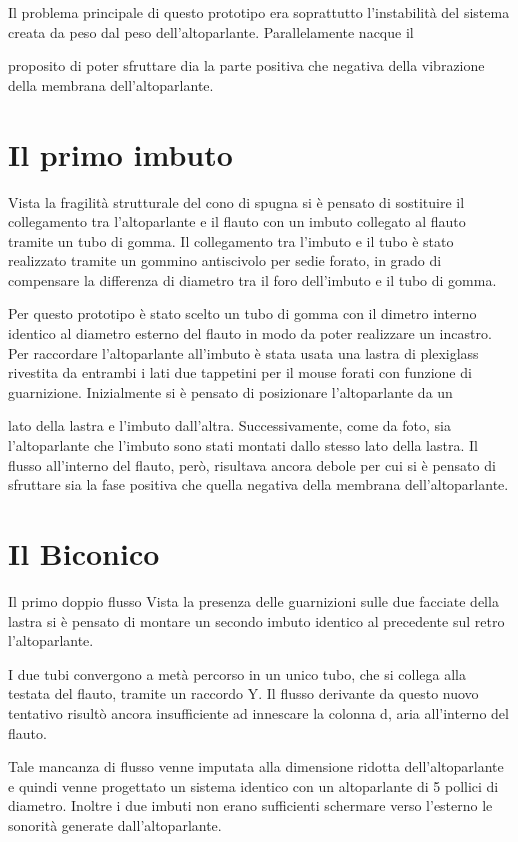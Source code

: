 Il problema principale di questo prototipo era soprattutto l’instabilità del sistema creata da peso dal peso dell’altoparlante. Parallelamente nacque il

proposito di poter sfruttare dia la parte positiva che negativa della vibrazione della membrana dell’altoparlante.

\section{Il primo imbuto}

Vista la fragilità strutturale del cono di spugna si è pensato di sostituire il
collegamento tra l’altoparlante e il flauto con un imbuto collegato al flauto tramite un tubo di gomma.  Il collegamento tra l’imbuto e il tubo è stato
realizzato tramite un gommino antiscivolo per sedie forato, in grado di compensare la differenza di diametro tra il foro dell’imbuto e il tubo di gomma.

Per questo prototipo è stato scelto un tubo di gomma con il dimetro interno identico al diametro esterno del flauto in modo da poter realizzare un incastro.
Per raccordare l’altoparlante all’imbuto è stata usata una lastra di plexiglass rivestita da entrambi i lati due tappetini per il mouse forati con funzione di guarnizione. Inizialmente si è pensato di posizionare l’altoparlante da un

lato della lastra e l’imbuto dall’altra. Successivamente, come da foto, sia l’altoparlante che l’imbuto sono stati montati dallo stesso lato della lastra.
Il flusso all’interno del flauto, però, risultava ancora debole per cui si è pensato di sfruttare sia la fase positiva che quella negativa della membrana dell’altoparlante.

\section{Il Biconico}

Il primo doppio flusso Vista la presenza delle guarnizioni sulle due facciate della lastra si è pensato di montare un secondo imbuto identico al precedente sul retro l’altoparlante.

I due tubi convergono a metà percorso in un unico tubo, che si collega alla testata del flauto, tramite un raccordo Y.
Il flusso derivante da questo nuovo tentativo risultò ancora insufficiente ad innescare la colonna d, aria all’interno del flauto.

Tale mancanza di flusso venne imputata alla dimensione ridotta dell’altoparlante e quindi venne progettato un sistema identico con un altoparlante di 5 pollici di diametro.
Inoltre i due imbuti non erano sufficienti  schermare verso l’esterno le sonorità generate dall’altoparlante.

